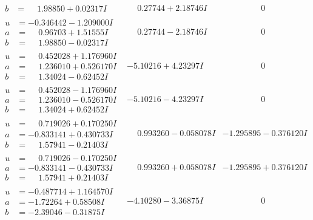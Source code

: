 \documentclass[1p]{elsarticle_modified}
\theoremstyle{definition}
\begin{document}
$$\begin{array}{c|c|c}
\begin{aligned}
b &= \phantom{-}1.98850 + 0.02317 I\end{aligned}
 & \phantom{-}0.27744 + 2.18746 I & \phantom{-0.000000 } 0 \\ \hline\begin{aligned}
u &= -0.346442 - 1.209000 I \\
a &= \phantom{-}0.96703 + 1.51555 I \\
b &= \phantom{-}1.98850 - 0.02317 I\end{aligned}
 & \phantom{-}0.27744 - 2.18746 I & \phantom{-0.000000 } 0 \\ \hline\begin{aligned}
u &= \phantom{-}0.452028 + 1.176960 I \\
a &= \phantom{-}1.236010 + 0.526170 I \\
b &= \phantom{-}1.34024 - 0.62452 I\end{aligned}
 & -5.10216 + 4.23297 I & \phantom{-0.000000 } 0 \\ \hline\begin{aligned}
u &= \phantom{-}0.452028 - 1.176960 I \\
a &= \phantom{-}1.236010 - 0.526170 I \\
b &= \phantom{-}1.34024 + 0.62452 I\end{aligned}
 & -5.10216 - 4.23297 I & \phantom{-0.000000 } 0 \\ \hline\begin{aligned}
u &= \phantom{-}0.719026 + 0.170250 I \\
a &= -0.833141 + 0.430733 I \\
b &= \phantom{-}1.57941 - 0.21403 I\end{aligned}
 & \phantom{-}0.993260 - 0.058078 I & -1.295895 - 0.376120 I \\ \hline\begin{aligned}
u &= \phantom{-}0.719026 - 0.170250 I \\
a &= -0.833141 - 0.430733 I \\
b &= \phantom{-}1.57941 + 0.21403 I\end{aligned}
 & \phantom{-}0.993260 + 0.058078 I & -1.295895 + 0.376120 I \\ \hline\begin{aligned}
u &= -0.487714 + 1.164570 I \\
a &= -1.72264 + 0.58508 I \\
b &= -2.39046 - 0.31875 I\end{aligned}
 & -4.10280 - 3.36875 I & \phantom{-0.000000 } 0 \\ \hline\begin{aligned}

\end{aligned}
\end{array}$$
\end{document}
